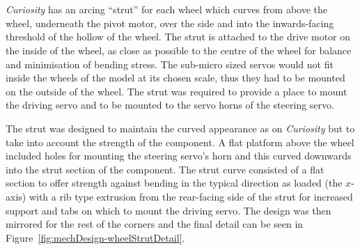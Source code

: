       \\\\
        \textit{Curiosity} has an arcing ``strut'' for each wheel which curves from above the wheel, underneath the pivot motor, over the side and into the inwards-facing threshold of the hollow of the wheel. The strut is attached to the drive motor on the inside of the wheel, as close as possible to the centre of the wheel for balance and minimisation of bending stress. The sub-micro sized servos would not fit inside the wheels of the model at its chosen scale, thus they had to be mounted on the outside of the wheel. The strut was required to provide a place to mount the driving servo and to be mounted to the servo horns of the steering servo.
        
        The strut was designed to maintain the curved appearance as on \textit{Curiosity} but to take into account the strength of the component. A flat platform above the wheel included holes for mounting the steering servo's horn and this curved downwards into the strut section of the component. The strut curve consisted of a flat section to offer strength against bending in the typical direction as loaded (the $x$-axis) with a rib type extrusion from the rear-facing side of the strut for increased support and tabs on which to mount the driving servo. The design was then mirrored for the rest of the corners and the final detail can be seen in Figure~\ref{fig:mechDesign-wheelStrutDetail}.
        
